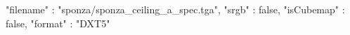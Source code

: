 { 
	"filename" : "sponza/sponza_ceiling_a_spec.tga", 
	"srgb" : false,
	"isCubemap" : false,
	"format" : "DXT5"
}